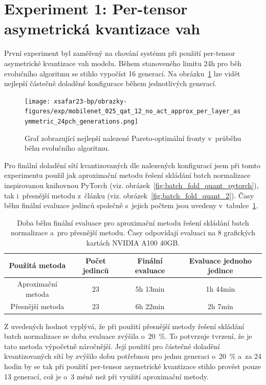 \section{Experiment 1: Per-tensor asymetrická kvantizace vah}

První experiment byl zaměřený na chování systému při použití per-tensor asymetrické kvantizace vah modelu. Během stanoveného limitu 24h pro běh evolučního algoritmu se stihlo vypočíst 16 generací. Na obrázku~\ref{fig:per_layer_asymmetric_generations} lze vidět nejlepší částečně doladěné konfigurace během jednotlivých generací. 

\begin{figure}[H]
	\centering
	\texttt{[image: xsafar23-bp/obrazky-figures/exp/mobilenet\_025\_qat\_12\_no\_act\_approx\_per\_layer\_asymmetric\_24pch\_generations.png]}
	\caption{Graf zobrazující nejlepší nalezené Pareto-optimální fronty v~průběhu běhu evolučního algoritmu.}
	\label{fig:per_layer_asymmetric_generations}
\end{figure}

Pro finální doladění sítí kvantizovaných dle nalezených konfigurací jsem při tomto experimentu použil jak aproximační metodu řešení skládání batch normalizace inspirovanou knihovnou PyTorch (viz. obrázek~\ref{fig:batch_fold_quant_pytorch}), tak i~přesnější metodu z~článku \cite{krishnamoorthi2018quantizing} (viz. obrázek~\ref{fig:batch_fold_quant_2}). Časy běhu finální evaluace jedinců společně s~jejich počtem jsou uvedeny v~tabulce~\ref{table:per_layer_final_time_schemes}.

\begin{table}[H]
	\centering
\begin{tabular}{ |c|c|c|c|  }
 \hline
  Použitá metoda & Počet jedinců & Finální evaluace & Evaluace jednoho jedince\\
 \hline
    Aproximační metoda & 23 & 5h 13min& 1h 44min\\
    Přesnější metoda & 23 & 6h 22min& 2h 7min\\
 \hline
\end{tabular}

\caption{\label{table:per_layer_final_time_schemes}Doba běhu finální evaluace pro aproximační metodu řešení skládání batch normalizace a~pro přesnější metodu. Časy odpovídají evaluaci na 8 grafických kartách NVIDIA A100 40GB.}
\end{table}
Z uvedených hodnot vyplývá, že při použití přesnější metody řešení skládání batch normalizace se doba evaluace zvýšila o~20~\%. To potvrzuje tvrzení, že je tato metoda výpočetně náročnější. Její použití pro částečné doladění kvantizovaných sítí by zvýšilo dobu potřebnou pro jednu generaci o~20~\% a~za 24 hodin by se tak při použití per-tensor asymetrické kvantizace stihlo provést pouze 13 generací, což je o~3 méně než při využití aproximační metody.

